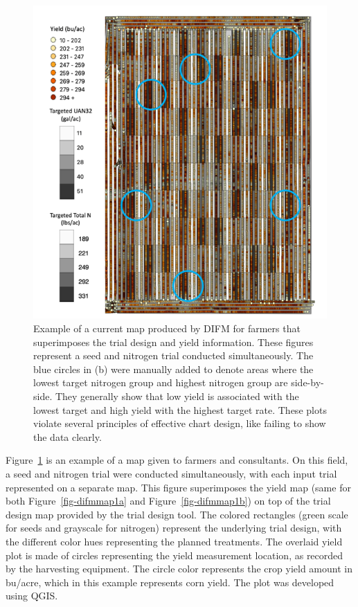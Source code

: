 \documentclass[
  authoryear,
  preprint,
  3p]{elsarticle}
\begin{document}
\begin{figure}
\begin{minipage}[t]{0.50\linewidth}
{{\includegraphics{../images/paper/nitrogen-trial.png}

}

}

\end{minipage}%

\caption{\label{fig-maps}Example of a current map produced by DIFM for
farmers that superimposes the trial design and yield information. These
figures represent a seed and nitrogen trial conducted simultaneously.
The blue circles in (b) were manually added to denote areas where the
lowest target nitrogen group and highest nitrogen group are
side-by-side. They generally show that low yield is associated with the
lowest target and high yield with the highest target rate. These plots
violate several principles of effective chart design, like failing to
show the data clearly.}

\end{figure}

Figure~\ref{fig-maps} is an example of a map given to farmers and
consultants. On this field, a seed and nitrogen trial were conducted
simultaneously, with each input trial represented on a separate map.
This figure superimposes the yield map (same for both
Figure~\ref{fig-difmmap1a} and Figure~\ref{fig-difmmap1b}) on top of the
trial design map provided by the trial design tool. The colored
rectangles (green scale for seeds and grayscale for nitrogen) represent
the underlying trial design, with the different color hues representing
the planned treatments. The overlaid yield plot is made of circles
representing the yield measurement location, as recorded by the
harvesting equipment. The circle color represents the crop yield amount
in bu/acre, which in this example represents corn yield. The plot was
developed using QGIS.
\end{document}
